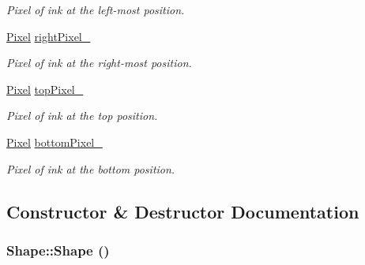 \begin{CompactItemize}
\begin{CompactList}\small\item\em Pixel of ink at the left-most position. \item\end{CompactList}\item 
\hypertarget{class_shape_16adfccce492a7a0e34c5ade941c32fd}{
\hyperlink{_pixel_8hpp_535e59456e3e633842529cfa8ea103c4}{Pixel} \hyperlink{class_shape_16adfccce492a7a0e34c5ade941c32fd}{rightPixel\_\-}}
\label{class_shape_16adfccce492a7a0e34c5ade941c32fd}

\begin{CompactList}\small\item\em Pixel of ink at the right-most position. \item\end{CompactList}\item 
\hypertarget{class_shape_c6755e0dbd9d2eaf537e232fd003c918}{
\hyperlink{_pixel_8hpp_535e59456e3e633842529cfa8ea103c4}{Pixel} \hyperlink{class_shape_c6755e0dbd9d2eaf537e232fd003c918}{topPixel\_\-}}
\label{class_shape_c6755e0dbd9d2eaf537e232fd003c918}

\begin{CompactList}\small\item\em Pixel of ink at the top position. \item\end{CompactList}\item 
\hypertarget{class_shape_8277820de6ff8da989a0659f4e5d82d1}{
\hyperlink{_pixel_8hpp_535e59456e3e633842529cfa8ea103c4}{Pixel} \hyperlink{class_shape_8277820de6ff8da989a0659f4e5d82d1}{bottomPixel\_\-}}
\label{class_shape_8277820de6ff8da989a0659f4e5d82d1}

\begin{CompactList}\small\item\em Pixel of ink at the bottom position. \item\end{CompactList}\end{CompactItemize}


\subsection{Constructor \& Destructor Documentation}
\hypertarget{class_shape_aa8d87171e65e0d8ba3c5459978992a7}{
\subsubsection[Shape]{\setlength{\rightskip}{0pt plus 5cm}Shape::Shape ()}}
\label{class_shape_aa8d87171e65e0d8ba3c5459978992a7}


